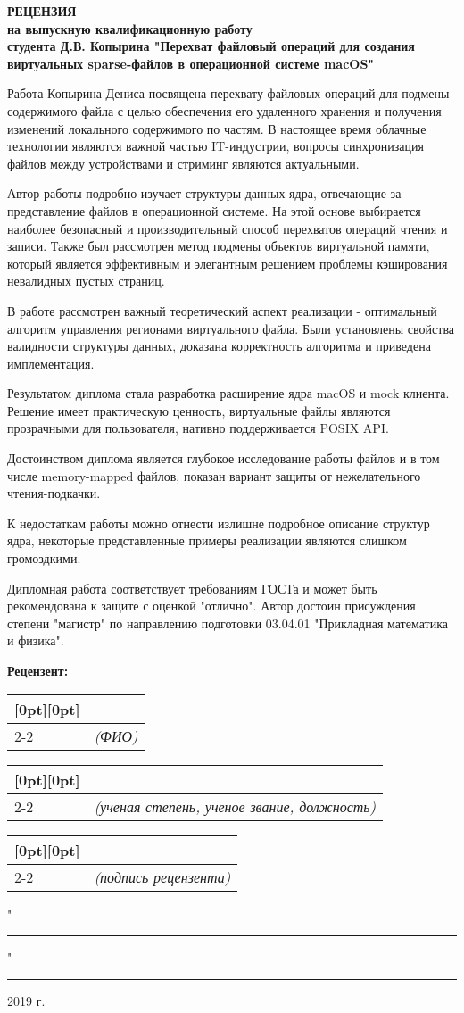 \documentclass[12pt, a4paper]{article}
\newcommand{\signature}[2][20em]{%
  \hspace{-8em}
  \begin{tabular}[t]{ p{#1} p{#1} }
    \raisebox{-.5ex}[0pt][0pt]{\bfseries } & \\
    \cline{2-2}
    & \centering\scriptsize\itshape (#2)
  \end{tabular}
}
\begin{document}
\setlength{\parskip}{1.3em}
\begin{center}
\textbf{РЕЦЕНЗИЯ} \\
\textbf{на выпускную квалификационную работу} \\
\textbf{студента Д.В. Копырина "Перехват файловый операций для создания виртуальных sparse-файлов в операционной системе macOS"}
\end{center}

\setlength{\parskip}{0.5em}
Работа Копырина Дениса посвящена перехвату файловых операций для подмены содержимого файла с целью обеспечения его удаленного хранения и получения изменений локального содержимого по частям. В настоящее время облачные технологии являются важной частью IT-индустрии, вопросы синхронизация файлов между устройствами и стриминг являются актуальными.

Автор работы подробно изучает структуры данных ядра, отвечающие за представление файлов в операционной системе. На этой основе выбирается наиболее безопасный и производительный способ перехватов операций чтения и записи. Также был рассмотрен метод подмены объектов виртуальной памяти, который является эффективным и элегантным решением проблемы кэширования невалидных пустых страниц.

В работе рассмотрен важный теоретический аспект реализации - оптимальный алгоритм управления регионами виртуального файла. Были установлены свойства валидности структуры данных, доказана корректность алгоритма и приведена имплементация.

Результатом диплома стала разработка расширение ядра macOS и mock клиента. Решение имеет практическую ценность, виртуальные файлы являются прозрачными для пользователя, нативно поддерживается POSIX API.

Достоинством диплома является глубокое исследование работы файлов и в том числе memory-mapped файлов, показан вариант защиты от нежелательного чтения-подкачки.

К недостаткам работы можно отнести излишне подробное описание структур ядра, некоторые представленные примеры реализации являются слишком громоздкими.

Дипломная работа соответствует требованиям ГОСТа и может быть рекомендована к защите с оценкой "отлично". Автор достоин присуждения степени "магистр" по направлению подготовки 03.04.01 "Прикладная математика и физика".

\setlength{\parskip}{1.2em}
\hfill \textbf{Рецензент:} \hspace{15.7em}

\signature{ФИО}

\signature{ученая степень, ученое звание, должность}

\signature{подпись рецензента}

\hfill "\rule{20pt}{1pt}" \rule{90pt}{1pt} 2019 г.
\end{document}
